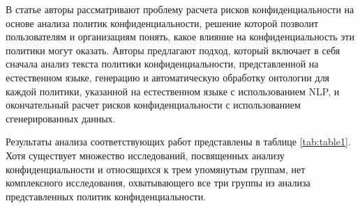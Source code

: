 \documentclass[../main]{subfiles}
\begin{document}
В статье \cite{P2Onto} авторы рассматривают проблему расчета рисков конфиденциальности на основе анализа политик конфиденциальности, решение которой позволит пользователям и организациям понять, какое влияние на конфиденциальность эти политики могут оказать. Авторы предлагают подход, который включает в себя сначала анализ текста политики конфиденциальности, представленной на естественном языке, генерацию и автоматическую обработку онтологии для каждой политики, указанной на естественном языке с использованием NLP, и окончательный расчет рисков конфиденциальности с использованием сгенерированных данных.

Результаты анализа соответствующих работ представлены в таблице \ref{tab:table1}. Хотя существует множество исследований, посвященных анализу конфиденциальности и относящихся к трем упомянутым группам, нет комплексного исследования, охватывающего все три группы из анализа представленных политик конфиденциальности.
\end{document}
